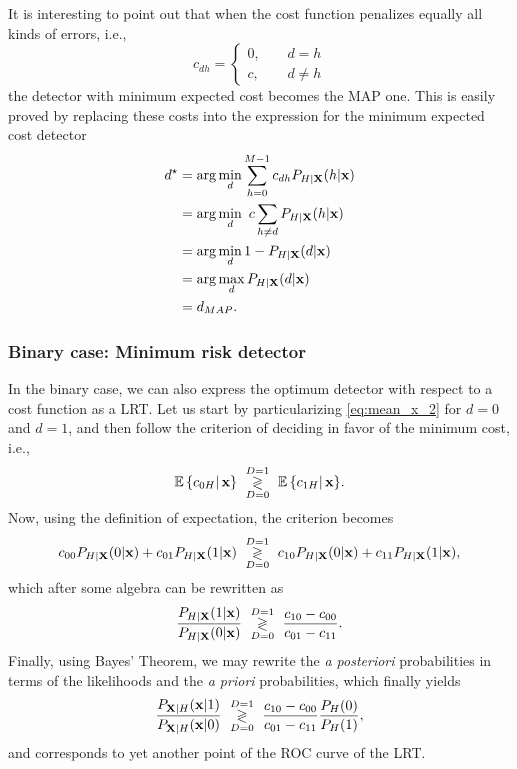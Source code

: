 It is interesting to point out that when the cost function penalizes equally all kinds of errors, i.e.,
$$c_{dh} = \left\{\begin{array}{ll} 0, & \;\;\;\;d=h \\ c, & \;\;\;\;d\neq h\end{array}\right.$$
the detector with minimum expected cost becomes the MAP one. This is easily proved by replacing these costs into the expression for the minimum expected cost detector
\begin{align}
d^\star & = \arg\min_{d} \sum_{h=0}^{M-1} c_{dh} P_{H|\bf X}(h|{\bf x}) \nonumber \\
        & = \arg\min_{d} \ c \sum_{h\neq d} P_{H|\bf X}(h|{\bf x}) \nonumber \\
        & = \arg\min_{d} 1 - P_{H|\bf X}(d|{\bf x}) \nonumber \\
        & = \arg\max_{d} P_{H|\bf X}(d|{\bf x}) \nonumber \\
        & = d_{MAP}.
\end{align}

\subsubsection{Binary case: Minimum risk detector}

In the binary case, we can also express the optimum detector with respect to a cost function as a LRT. Let us start by particularizing \eqref{eq:mean_x_2} for $d=0$ and $d=1$, and then follow the criterion of deciding in favor of the minimum cost, i.e.,
$$\mathbb{E}\left\{ c_{0H}\right|{\bf x}\} \,\, \underset{D=0}{\overset{D=1}{\gtrless}}\,\, \mathbb{E}\left\{ c_{1H}\right|{\bf x}\}.$$
Now, using the definition of expectation, the criterion becomes
$$c_{00}P_{H|{\bf X}}(0|{\bf x}) + c_{01} P_{H|{\bf X}}(1|{\bf x})\,\, \underset{D=0}{\overset{D=1}{\gtrless}}\,\, c_{10}P_{H|{\bf X}}(0|{\bf x}) + c_{11} P_{H|{\bf X}}(1|{\bf x}),$$
which after some algebra can be rewritten as
$$\displaystyle\frac{P_{H|{\bf X}}(1|{\bf x})}{P_{H|{\bf X}}(0|{\bf x})}\,\, \underset{D=0}{\overset{D=1}{\gtrless}}\,\, \displaystyle\frac{c_{10}-c_{00}}{c_{01}-c_{11}}.$$
Finally, using Bayes' Theorem, we may rewrite the \emph{a posteriori} probabilities in terms of the likelihoods and the \emph{a priori} probabilities, which finally yields
$$\displaystyle\frac{P_{{\bf X}|H}({\bf x}|1)}{P_{{\bf X}|H}({\bf x}|0)}\,\, \underset{D=0}{\overset{D=1}{\gtrless}}\,\, \displaystyle\frac{c_{10}-c_{00}}{c_{01}-c_{11}} \displaystyle\frac{P_H(0)}{P_H(1)},$$
and corresponds to yet another point of the ROC curve of the LRT.


